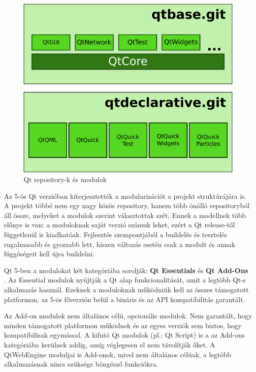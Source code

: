 \documentclass[12pt]{report}
\begin{document}
\begin{figure}[h]
    \centering
    \includegraphics[scale=.66]{qt-repos-and-modules}
    \caption{
        \label{fig:qt-repos-and-modules}
        Qt repository-k és modulok
    }
\end{figure}

Az 5-ös Qt verzióban kiterjesztették a modularizációt a projekt struktúrájára is. A projekt
többé nem egy nagy közös repository, hanem több önálló repositoryból áll össze, melyeket
a modulok szerint választottak szét. Ennek a modellnek több előnye is van: a moduloknak
saját verzió számuk lehet, ezért a Qt release-től függetlenül is kiadhatóak. Fejlesztés
szempontjából a buildelés és tesztelés rugalmasabb és gyorsabb lett, hiszen változás esetén
csak a modult és annak függőségeit kell újra buildelni.

Qt 5-ben a modulokat két kategóriába sorolják: \textbf{Qt Essentials} és
\textbf{Qt Add-Ons} \cite{bib:qt-doc-qtmodules}.
Az Essential modulok nyújtják a Qt alap funkcionalitását, amit a legtöbb Qt-s alkalmazás
használ. Ezeknek a moduloknak működniük kell az összes támogatott platformon, az 5-ös
főverzión belül a bináris és az API kompatibilitás garantált.

Az Add-on modulok nem általános célú, opcionális modulok. Nem garantált, hogy minden
támogatott platformon működnek és az egyes verziók sem biztos, hogy kompatibilisak egymással.
A kifutó Qt modulok (pl.: Qt Script) is a az Add-ons kategóriába kerülnek addig, amíg
véglegesen el nem távolítják őket. A QtWebEngine moduljai is Add-onok, mivel nem általános
célúak, a legtöbb alkalmazásnak nincs szüksége böngésző funkciókra.
\end{document}
